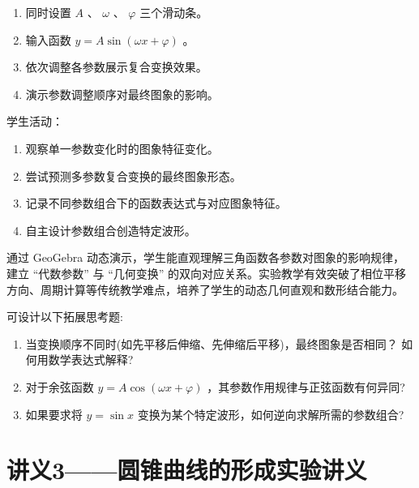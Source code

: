 \begin{description}
\begin{enumerate}[label=(\zhnum*)]
\begin{enumerate}
              \begin{enumerate}
                \item 同时设置 \(A\) 、 \(\omega\) 、 \(\varphi\) 三个滑动条。
                \item 输入函数 \(y = A\sin \left( {\omega x + \varphi }\right)\) 。
                \item 依次调整各参数展示复合变换效果。
                \item 演示参数调整顺序对最终图象的影响。
              \end{enumerate}
        \end{enumerate}

        \hspace*{2em}学生活动：
        \begin{enumerate}
            \item 观察单一参数变化时的图象特征变化。
            \item 尝试预测多参数复合变换的最终图象形态。
            \item 记录不同参数组合下的函数表达式与对应图象特征。
            \item 自主设计参数组合创造特定波形。
        \end{enumerate}
    \end{enumerate}
  \item[结论] \hspace*{2em} 通过 GeoGebra 动态演示，学生能直观理解三角函数各参数对图象的影响规律，建立 “代数参数” 与 “几何变换” 的双向对应关系。实验教学有效突破了相位平移方向、周期计算等传统教学难点，培养了学生的动态几何直观和数形结合能力。
  \item[分析]
  \hspace*{2em} 可设计以下拓展思考题:
  \begin{enumerate}
    \item 当变换顺序不同时(如先平移后伸缩、先伸缩后平移)，最终图象是否相同？ 如何用数学表达式解释?
    \item 对于余弦函数 \(y = A\cos \left( {\omega x + \varphi }\right)\) ，其参数作用规律与正弦函数有何异同?
    \item 如果要求将 \(y = \sin x\) 变换为某个特定波形，如何逆向求解所需的参数组合?
  \end{enumerate}
\end{description}


\section{讲义3——圆锥曲线的形成实验讲义}

